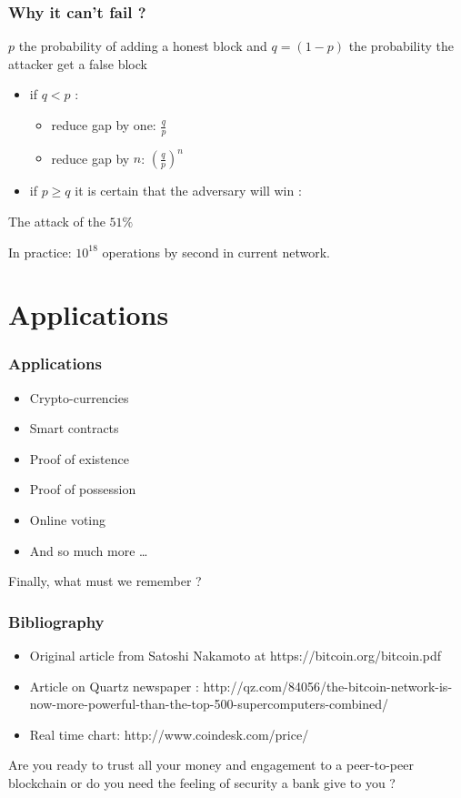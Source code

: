 \documentclass[12pt]{beamer}
\begin{document}
\begin{frame}
\frametitle{Why it can't fail ?}
$p$ the probability of adding a honest block and $q = (1-p)$ the probability the attacker get a false block
\begin{itemize}
\item if $q < p$ :
\begin{itemize}
\item reduce gap by one: $\frac{q}{p}$
\item reduce gap by $n$: $\left (\frac{q}{p}\right )^n$
\end{itemize}
\item if $p \ge q$ it is certain that the adversary will win : 
\end{itemize}
\begin{center}
\color{red!50!black} \large The attack of the $51\%$
\end{center}

In practice: $10^{18}$ operations by second in current network.

\end{frame}

\section{Applications}

\begin{frame}
    \frametitle{Applications}
    \begin{itemize}
        \item Crypto-currencies
        \item Smart contracts
        \item Proof of existence
        \item Proof of possession
        \item Online voting
        \item And so much more \ldots
    \end{itemize}
\end{frame}

\begin{frame}
Finally, what must we remember ? %
\end{frame}

\begin{frame}
\frametitle{Bibliography}
\begin{itemize}
\item Original article from Satoshi Nakamoto at https://bitcoin.org/bitcoin.pdf
\item Article on Quartz newspaper : http://qz.com/84056/the-bitcoin-network-is-now-more-powerful-than-the-top-500-supercomputers-combined/
\item Real time chart: http://www.coindesk.com/price/
\end{itemize}

\end{frame}

\begin{frame}

Are you ready to trust all your money and engagement to a peer-to-peer blockchain or do you need the feeling of security a bank give to you ?


\end{frame}
\end{document}
